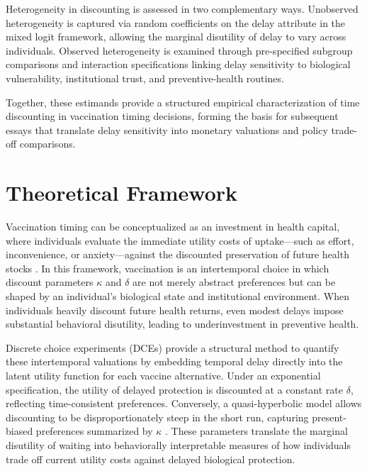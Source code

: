\documentclass[doublespacing]{utdthesis}
\let\cite=\citep
\begin{document}
Heterogeneity in discounting is assessed in two complementary ways. Unobserved heterogeneity is captured via random coefficients on the delay attribute in the mixed logit framework, allowing the marginal disutility of delay to vary across individuals. Observed heterogeneity is examined through pre-specified subgroup comparisons and interaction specifications linking delay sensitivity to biological vulnerability, institutional trust, and preventive-health routines.

Together, these estimands provide a structured empirical characterization of time discounting in vaccination timing decisions, forming the basis for subsequent essays that translate delay sensitivity into monetary valuations and policy trade-off comparisons.

\section{Theoretical Framework}
\label{sec:essay1_theory}

Vaccination timing can be conceptualized as an investment in health capital, where individuals evaluate the immediate utility costs of uptake---such as effort, inconvenience, or anxiety---against the discounted preservation of future health stocks \cite{Frederick2002}. In this framework, vaccination is an intertemporal choice in which discount parameters $\kappa$ and $\delta$ are not merely abstract preferences but can be shaped by an individual’s biological state and institutional environment. When individuals heavily discount future health returns, even modest delays impose substantial behavioral disutility, leading to underinvestment in preventive health.

Discrete choice experiments (DCEs) provide a structural method to quantify these intertemporal valuations by embedding temporal delay directly into the latent utility function for each vaccine alternative. Under an exponential specification, the utility of delayed protection is discounted at a constant rate $\delta$, reflecting time-consistent preferences. Conversely, a quasi-hyperbolic model allows discounting to be disproportionately steep in the short run, capturing present-biased preferences summarized by $\kappa$ \cite{Laibson1997}. These parameters translate the marginal disutility of waiting into behaviorally interpretable measures of how individuals trade off current utility costs against delayed biological protection.
\end{document}
